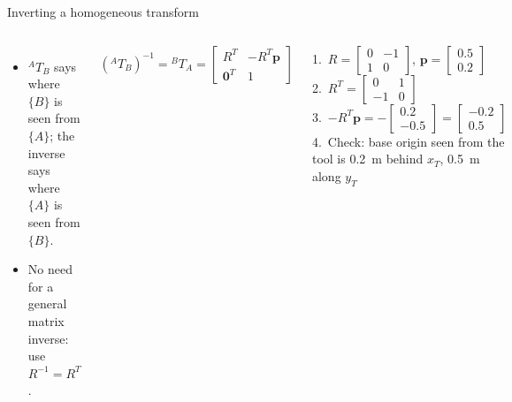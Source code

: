 \documentclass[aspectratio=169,10pt]{beamer}
\begin{document}
\begin{frame}[t]{Inverting a homogeneous transform}
\begin{columns}[T,onlytextwidth]
\begin{itemize}\small
\item ${}^AT_B$ says where $\{B\}$ is seen from $\{A\}$; the inverse says where $\{A\}$ is seen from $\{B\}$.
\item No need for a general matrix inverse: use $R^{-1}=R^T$.
\end{itemize}
\begin{eqbox}
\vspace{-2mm}
\[
({}^AT_B)^{-1}={}^BT_A=\begin{bmatrix}R^T & -R^T\bm p\\ \bm 0^T & 1\end{bmatrix}
\]
\vspace{-4mm}
\end{eqbox}
\begin{keybox}
\small
1.\ $R=\begin{bmatrix}0&-1\\1&0\end{bmatrix}$, $\bm p=\begin{bmatrix}0.5\\0.2\end{bmatrix}$\\[1mm]
2.\ $R^T=\begin{bmatrix}0&1\\-1&0\end{bmatrix}$\\[1mm]
3.\ $-R^T\bm p=-\begin{bmatrix}0.2\\-0.5\end{bmatrix}=\begin{bmatrix}-0.2\\0.5\end{bmatrix}$\\[1mm]
4.\ Check: base origin seen from the tool is \SI{0.2}{m} behind $x_T$, \SI{0.5}{m} along $y_T$ \checkmark
\end{keybox}
\end{columns}
\end{frame}
\end{document}
